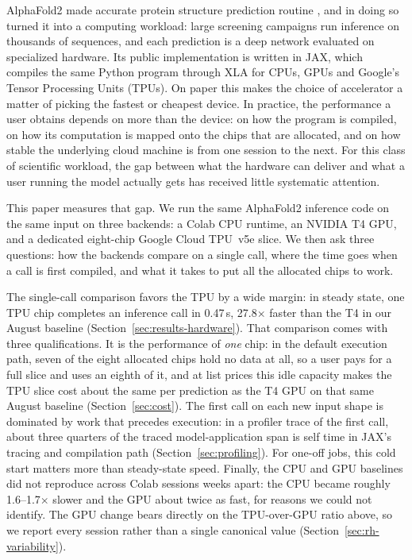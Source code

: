 
AlphaFold2 made accurate protein structure prediction routine
\citep{jumper2021alphafold}, and in doing so turned it into a computing
workload: large screening campaigns run inference on thousands of
sequences, and each prediction is a deep network evaluated on
specialized hardware. Its public implementation is written in JAX, which
compiles the same Python program through XLA for CPUs, GPUs and Google's
Tensor Processing Units (TPUs). On paper this makes the choice of
accelerator a matter of picking the fastest or cheapest device. In
practice, the performance a user obtains depends on more than the
device: on how the program is compiled, on how its computation is mapped
onto the chips that are allocated, and on how stable the underlying
cloud machine is from one session to the next. For this class of
scientific workload, the gap between what the hardware can deliver and
what a user running the model actually gets has received little
systematic attention.

This paper measures that gap. We run the same AlphaFold2 inference code
on the same input on three backends: a Colab CPU runtime, an NVIDIA T4
GPU, and a dedicated eight-chip Google Cloud TPU~v5e slice. We then ask
three questions: how the backends compare on a single call, where the
time goes when a call is first compiled, and what it takes to put all
the allocated chips to work.

The single-call comparison favors the TPU by a wide margin: in steady
state, one TPU chip completes an inference call in 0.47\,s, 27.8$\times$
faster than the T4 in our August baseline
(Section~\ref{sec:results-hardware}).
That comparison comes with three qualifications. It is the performance of
\emph{one} chip: in the default execution path, seven of the eight
allocated chips hold no data at all, so a user pays for a full slice and
uses an eighth of it, and at list prices this idle capacity makes the
TPU slice cost about the same per prediction as the T4 GPU on that same
August baseline (Section~\ref{sec:cost}). The first call on each new
input shape is dominated by work that precedes execution: in a profiler
trace of the first call, about three quarters of the traced
model-application span is self time in JAX's tracing and compilation
path (Section~\ref{sec:profiling}). For one-off jobs, this cold start
matters more than steady-state speed. Finally, the CPU and GPU
baselines did not reproduce across Colab sessions weeks apart: the CPU became roughly
1.6--1.7$\times$ slower and the GPU about twice as fast, for reasons we
could not identify. The GPU change bears directly on the TPU-over-GPU
ratio above, so we report every session rather than a single canonical
value (Section~\ref{sec:rh-variability}).

